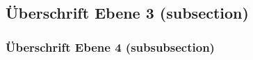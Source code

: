 \subsection{Überschrift Ebene 3 (subsection)}
\vspace{3mm} %

\subsubsection{Überschrift Ebene 4 (subsubsection)}
